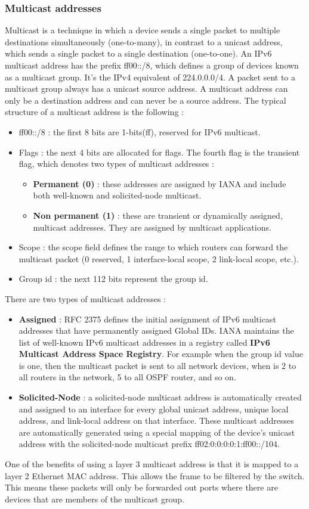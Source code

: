 \documentclass[11pt]{article}
\begin{document}
\subsubsection{Multicast addresses}
Multicast is a technique in which a device sends a single packet to multiple destinations simultaneously (one-to-many), in contrast to a unicast address, which sends a single packet to a single destination (one-to-one). An IPv6 multicast address has the prefix ff00::/8, which defines a group of devices known as a multicast group. It's the IPv4 equivalent of 224.0.0.0/4. A packet sent to a multicast group always has a unicast source address. A multicast address can only be a destination address and can never be a source address. The typical structure of a multicast address is the following :
\begin{itemize}
\item ff00::/8 : the first 8 bits are 1-bits(ff), reserved for IPv6 multicast.
\item Flags : the next 4 bits are allocated for flags. The fourth flag is the transient flag, which denotes two types of multicast addresses :
\begin{itemize}
\item \textbf{Permanent (0)} : these addresses are assigned by IANA and include both well-known and solicited-node multicast.
\item \textbf{Non permanent (1)} : these are transient or dynamically assigned, multicast addresses. They are assigned by multicast applications. 
\end{itemize}
\item Scope : the scope field defines the range to which routers can forward the multicast packet (0 reserved, 1 interface-local scope, 2 link-local scope, etc.).
\item Group id : the next 112 bits represent the group id.
\end{itemize}
There are two types of multicast addresses :
\begin{itemize}
\item \textbf{Assigned} : RFC 2375 defines the initial assignment of IPv6 multicast addresses that have permanently assigned Global IDs. IANA maintains the list of well-known IPv6 multicast addresses in a registry called \textbf{IPv6 Multicast Address Space Registry}. For example when the group id value is one, then the multicast packet is sent to all network devices, when is 2 to all routers in the network, 5 to all OSPF router, and so on.
\item \textbf{Solicited-Node} : a solicited-node multicast address is automatically created and assigned to an interface for every global unicast address, unique local address, and link-local address on that interface. These multicast addresses are automatically generated using a special mapping of the device's unicast address with the solicited-node multicast prefix ff02:0:0:0:0:1:ff00::/104.
\end{itemize}
One of the benefits of using a layer 3 multicast address is that it is mapped to a layer 2 Ethernet MAC address. This allows the frame to be filtered by the switch. This means these packets will only be forwarded out ports where there are devices that are members of the multicast group.
\end{document}
